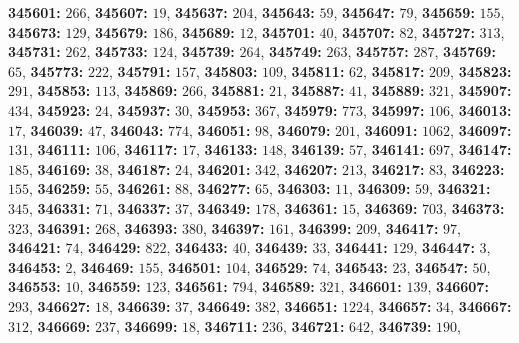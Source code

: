 \textsf{\bfseries 345601:} $266$, \textsf{\bfseries 345607:} $19$, \textsf{\bfseries 345637:} $204$, \textsf{\bfseries 345643:} $59$, \textsf{\bfseries 345647:} $79$, \textsf{\bfseries 345659:} $155$, \textsf{\bfseries 345673:} $129$, \textsf{\bfseries 345679:} $186$, \textsf{\bfseries 345689:} $12$, \textsf{\bfseries 345701:} $40$, \textsf{\bfseries 345707:} $82$, \textsf{\bfseries 345727:} $313$, \textsf{\bfseries 345731:} $262$, \textsf{\bfseries 345733:} $124$, \textsf{\bfseries 345739:} $264$, \textsf{\bfseries 345749:} $263$, \textsf{\bfseries 345757:} $287$, \textsf{\bfseries 345769:} $65$, \textsf{\bfseries 345773:} $222$, \textsf{\bfseries 345791:} $157$, \textsf{\bfseries 345803:} $109$, \textsf{\bfseries 345811:} $62$, \textsf{\bfseries 345817:} $209$, \textsf{\bfseries 345823:} $291$, \textsf{\bfseries 345853:} $113$, \textsf{\bfseries 345869:} $266$, \textsf{\bfseries 345881:} $21$, \textsf{\bfseries 345887:} $41$, \textsf{\bfseries 345889:} $321$, \textsf{\bfseries 345907:} $434$, \textsf{\bfseries 345923:} $24$, \textsf{\bfseries 345937:} $30$, \textsf{\bfseries 345953:} $367$, \textsf{\bfseries 345979:} $773$, \textsf{\bfseries 345997:} $106$, \textsf{\bfseries 346013:} $17$, \textsf{\bfseries 346039:} $47$, \textsf{\bfseries 346043:} $774$, \textsf{\bfseries 346051:} $98$, \textsf{\bfseries 346079:} $201$, \textsf{\bfseries 346091:} $1062$, \textsf{\bfseries 346097:} $131$, \textsf{\bfseries 346111:} $106$, \textsf{\bfseries 346117:} $17$, \textsf{\bfseries 346133:} $148$, \textsf{\bfseries 346139:} $57$, \textsf{\bfseries 346141:} $697$, \textsf{\bfseries 346147:} $185$, \textsf{\bfseries 346169:} $38$, \textsf{\bfseries 346187:} $24$, \textsf{\bfseries 346201:} $342$, \textsf{\bfseries 346207:} $213$, \textsf{\bfseries 346217:} $83$, \textsf{\bfseries 346223:} $155$, \textsf{\bfseries 346259:} $55$, \textsf{\bfseries 346261:} $88$, \textsf{\bfseries 346277:} $65$, \textsf{\bfseries 346303:} $11$, \textsf{\bfseries 346309:} $59$, \textsf{\bfseries 346321:} $345$, \textsf{\bfseries 346331:} $71$, \textsf{\bfseries 346337:} $37$, \textsf{\bfseries 346349:} $178$, \textsf{\bfseries 346361:} $15$, \textsf{\bfseries 346369:} $703$, \textsf{\bfseries 346373:} $323$, \textsf{\bfseries 346391:} $268$, \textsf{\bfseries 346393:} $380$, \textsf{\bfseries 346397:} $161$, \textsf{\bfseries 346399:} $209$, \textsf{\bfseries 346417:} $97$, \textsf{\bfseries 346421:} $74$, \textsf{\bfseries 346429:} $822$, \textsf{\bfseries 346433:} $40$, \textsf{\bfseries 346439:} $33$, \textsf{\bfseries 346441:} $129$, \textsf{\bfseries 346447:} $3$, \textsf{\bfseries 346453:} $2$, \textsf{\bfseries 346469:} $155$, \textsf{\bfseries 346501:} $104$, \textsf{\bfseries 346529:} $74$, \textsf{\bfseries 346543:} $23$, \textsf{\bfseries 346547:} $50$, \textsf{\bfseries 346553:} $10$, \textsf{\bfseries 346559:} $123$, \textsf{\bfseries 346561:} $794$, \textsf{\bfseries 346589:} $321$, \textsf{\bfseries 346601:} $139$, \textsf{\bfseries 346607:} $293$, \textsf{\bfseries 346627:} $18$, \textsf{\bfseries 346639:} $37$, \textsf{\bfseries 346649:} $382$, \textsf{\bfseries 346651:} $1224$, \textsf{\bfseries 346657:} $34$, \textsf{\bfseries 346667:} $312$, \textsf{\bfseries 346669:} $237$, \textsf{\bfseries 346699:} $18$, \textsf{\bfseries 346711:} $236$, \textsf{\bfseries 346721:} $642$, \textsf{\bfseries 346739:} $190$, 
